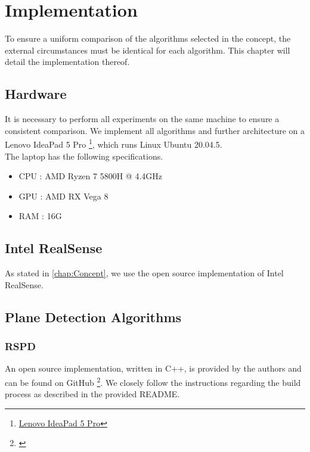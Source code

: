 \documentclass[main.tex]{subfiles}
\begin{document}
\chapter{Implementation}
To ensure a uniform comparison of the algorithms selected in the concept, the external circumstances 
must be identical for each algorithm. This chapter will detail the implementation thereof.

\section{Hardware}
It is necessary to perform all experiments on the same machine to ensure a consistent comparison.
We implement all algorithms and further architecture on a Lenovo IdeaPad 5 Pro \footnote{\href{https://www.lenovo.com/de/de/laptops/ideapad/500-series/IdeaPad-5-Pro-16ACH6/p/88IPS501619}{Lenovo IdeaPad 5 Pro}},
which runs Linux Ubuntu 20.04.5.\\
The laptop has the following specifications.


\begin{mylist}
    \begin{itemize}
        \item CPU : AMD Ryzen 7 5800H @ 4.4GHz
        \item GPU : AMD RX Vega 8
        \item RAM : 16G
    \end{itemize}
    \end{mylist}

\section{Intel RealSense}
As stated in \ref{chap:Concept}, we use the open source implementation of Intel RealSense. 

\section{Plane Detection Algorithms}
\subsection*{RSPD}
An open source implementation, written in C++, is provided by the authors \citeauthor{Araújo_Oliveira_2020}\cite{Araújo_Oliveira_2020} and
can be found on GitHub \footnote{\href{https://github.com/abnerrjo/PlaneDetection}{}}.
We closely follow the instructions regarding the build process as described in the provided README.
\end{document}
